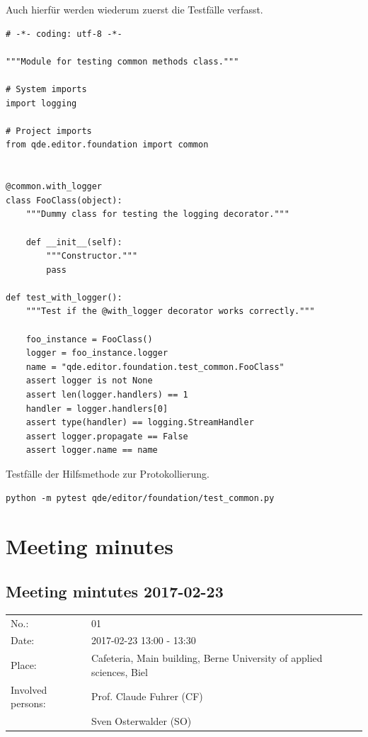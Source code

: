 \documentclass[10pt, openright, notitlepage]{scrreprt}
\begin{document}
Auch hierfür werden wiederum zuerst die Testfälle verfasst.

\begin{listing}[H]
\begin{verbatim}
# -*- coding: utf-8 -*-

"""Module for testing common methods class."""

# System imports
import logging

# Project imports
from qde.editor.foundation import common


@common.with_logger
class FooClass(object):
    """Dummy class for testing the logging decorator."""

    def __init__(self):
        """Constructor."""
        pass

def test_with_logger():
    """Test if the @with_logger decorator works correctly."""

    foo_instance = FooClass()
    logger = foo_instance.logger
    name = "qde.editor.foundation.test_common.FooClass"
    assert logger is not None
    assert len(logger.handlers) == 1
    handler = logger.handlers[0]
    assert type(handler) == logging.StreamHandler
    assert logger.propagate == False
    assert logger.name == name
\end{verbatim}
\caption{\label{fig:editor-common-logging-test}
Testfälle der Hilfsmethode zur Protokollierung.}
\end{listing}

\begin{verbatim}
python -m pytest qde/editor/foundation/test_common.py
\end{verbatim}


\section{Meeting minutes}
\label{sec:org3cf3682}

\subsection{Meeting mintutes 2017-02-23}
\label{sec:org3163728}

\begin{center}
\begin{tabular}{ll}
No.: & 01\\
Date: & 2017-02-23 13:00 - 13:30\\
Place: & Cafeteria, Main building, Berne University of applied sciences, Biel\\
Involved persons: & Prof. Claude Fuhrer (CF)\\
 & Sven Osterwalder (SO)\\
\end{tabular}
\end{center}
\end{document}
